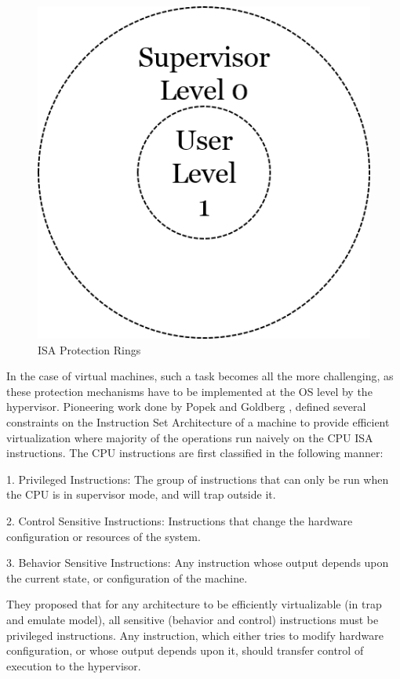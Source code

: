 \begin{figure}[H]
  \centering
  \includegraphics[scale=0.6]{figures/protect_levels.png}
  \caption{ISA Protection Rings}
  \label{fig:protect_2}
\end{figure}
In the case of virtual machines, such a task becomes all the more challenging, as these protection mechanisms have to be implemented at the OS level by the hypervisor. Pioneering work done by Popek and Goldberg \cite{popek}, defined several constraints on the Instruction Set Architecture of a machine to provide efficient virtualization where majority of the operations run naively on the CPU ISA instructions. The CPU instructions are first classified in the following manner:

1. Privileged Instructions: The group of instructions that can only be run when the CPU is in supervisor mode, and will trap outside it.

2. Control Sensitive Instructions: Instructions that change the hardware configuration or resources of the system.

3. Behavior Sensitive Instructions: Any instruction whose output depends upon the current state, or configuration of the machine.

They proposed that for any architecture to be efficiently virtualizable (in trap and emulate model), all sensitive (behavior and control) instructions must be privileged instructions. Any instruction, which either tries to modify hardware configuration, or whose output depends upon it, should transfer control of execution to the hypervisor.

